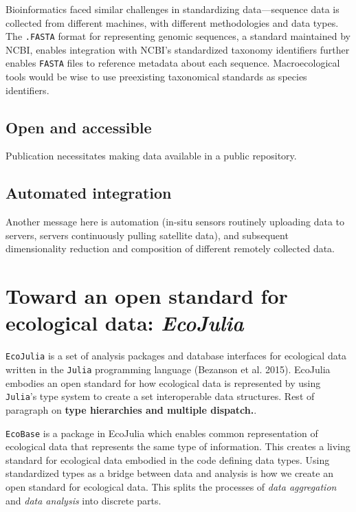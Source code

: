 \documentclass[10pt,oneside]{article}
\begin{document}
Bioinformatics faced similar challenges in standardizing data---sequence
data is collected from different machines, with different methodologies
and data types. The \texttt{.FASTA} format for representing genomic
sequences, a standard maintained by NCBI, enables integration with
NCBI's standardized taxonomy identifiers further enables \texttt{FASTA}
files to reference metadata about each sequence. Macroecological tools
would be wise to use preexisting taxonomical standards as species
identifiers.

\hypertarget{open-and-accessible}{%
\subsection{Open and accessible}\label{open-and-accessible}}

Publication necessitates making data available in a public repository.

\hypertarget{automated-integration}{%
\subsection{Automated integration}\label{automated-integration}}

Another message here is automation (in-situ sensors routinely uploading
data to servers, servers continuously pulling satellite data), and
subsequent dimensionality reduction and composition of different
remotely collected data.

\hypertarget{toward-an-open-standard-for-ecological-data-ecojulia}{%
\section{\texorpdfstring{Toward an open standard for ecological data:
\emph{EcoJulia}}{Toward an open standard for ecological data: EcoJulia}}\label{toward-an-open-standard-for-ecological-data-ecojulia}}

\texttt{EcoJulia} is a set of analysis packages and database interfaces
for ecological data written in the \texttt{Julia} programming language
(Bezanson et al. 2015). EcoJulia embodies an open standard for how
ecological data is represented by using \texttt{Julia}'s type system to
create a set interoperable data structures. Rest of paragraph on
\textbf{type hierarchies and multiple dispatch.}.

\texttt{EcoBase} is a package in EcoJulia which enables common
representation of ecological data that represents the same type of
information. This creates a living standard for ecological data embodied
in the code defining data types. Using standardized types as a bridge
between data and analysis is how we create an open standard for
ecological data. This splits the processes of \emph{data aggregation}
and \emph{data analysis} into discrete parts.
\end{document}
